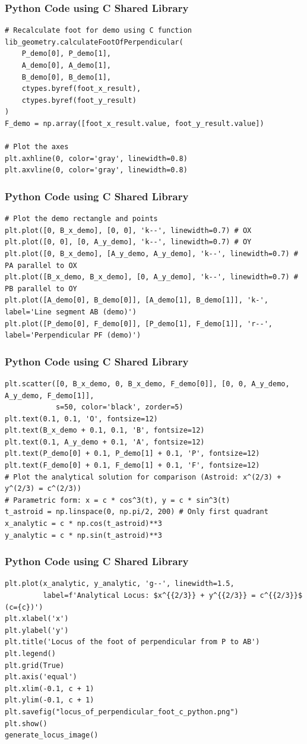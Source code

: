 \documentclass{beamer}
\begin{document}
\begin{frame}[fragile]
\frametitle{Python Code using C Shared Library}
\begin{lstlisting}
# Recalculate foot for demo using C function
lib_geometry.calculateFootOfPerpendicular(
    P_demo[0], P_demo[1],
    A_demo[0], A_demo[1],
    B_demo[0], B_demo[1],
    ctypes.byref(foot_x_result),
    ctypes.byref(foot_y_result)
)
F_demo = np.array([foot_x_result.value, foot_y_result.value])

# Plot the axes
plt.axhline(0, color='gray', linewidth=0.8)
plt.axvline(0, color='gray', linewidth=0.8)
\end{lstlisting}
\end{frame}

\begin{frame}[fragile]
\frametitle{Python Code using C Shared Library}
\begin{lstlisting}
# Plot the demo rectangle and points
plt.plot([0, B_x_demo], [0, 0], 'k--', linewidth=0.7) # OX
plt.plot([0, 0], [0, A_y_demo], 'k--', linewidth=0.7) # OY
plt.plot([0, B_x_demo], [A_y_demo, A_y_demo], 'k--', linewidth=0.7) # PA parallel to OX
plt.plot([B_x_demo, B_x_demo], [0, A_y_demo], 'k--', linewidth=0.7) # PB parallel to OY
plt.plot([A_demo[0], B_demo[0]], [A_demo[1], B_demo[1]], 'k-', label='Line segment AB (demo)')
plt.plot([P_demo[0], F_demo[0]], [P_demo[1], F_demo[1]], 'r--', label='Perpendicular PF (demo)')
\end{lstlisting}
\end{frame}

\begin{frame}[fragile]
\frametitle{Python Code using C Shared Library}
\begin{lstlisting}
plt.scatter([0, B_x_demo, 0, B_x_demo, F_demo[0]], [0, 0, A_y_demo, A_y_demo, F_demo[1]],
            s=50, color='black', zorder=5)
plt.text(0.1, 0.1, 'O', fontsize=12)
plt.text(B_x_demo + 0.1, 0.1, 'B', fontsize=12)
plt.text(0.1, A_y_demo + 0.1, 'A', fontsize=12)
plt.text(P_demo[0] + 0.1, P_demo[1] + 0.1, 'P', fontsize=12)
plt.text(F_demo[0] + 0.1, F_demo[1] + 0.1, 'F', fontsize=12)
# Plot the analytical solution for comparison (Astroid: x^(2/3) + y^(2/3) = c^(2/3))
# Parametric form: x = c * cos^3(t), y = c * sin^3(t)
t_astroid = np.linspace(0, np.pi/2, 200) # Only first quadrant
x_analytic = c * np.cos(t_astroid)**3
y_analytic = c * np.sin(t_astroid)**3
\end{lstlisting}
\end{frame}

\begin{frame}[fragile]
\frametitle{Python Code using C Shared Library}
\begin{lstlisting}
plt.plot(x_analytic, y_analytic, 'g--', linewidth=1.5,
         label=f'Analytical Locus: $x^{{2/3}} + y^{{2/3}} = c^{{2/3}}$ (c={c})')
plt.xlabel('x')
plt.ylabel('y')
plt.title('Locus of the foot of perpendicular from P to AB')
plt.legend()
plt.grid(True)
plt.axis('equal')
plt.xlim(-0.1, c + 1)
plt.ylim(-0.1, c + 1)
plt.savefig("locus_of_perpendicular_foot_c_python.png")
plt.show()
generate_locus_image()
\end{lstlisting}
\end{frame}
\end{document}
